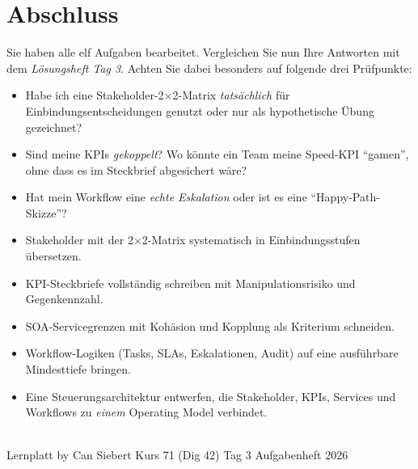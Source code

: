 \documentclass[11pt,a4paper,oneside]{article}
\begin{document}
\clearpage

\section*{Abschluss}
\thispagestyle{plain}

\noindent Sie haben alle elf Aufgaben bearbeitet. Vergleichen Sie nun Ihre Antworten mit dem \emph{L\"osungsheft Tag 3}. Achten Sie dabei besonders auf folgende drei Pr\"ufpunkte:

\begin{itemize}
  \item Habe ich eine Stakeholder-2$\times$2-Matrix \emph{tats\"achlich} f\"ur Einbindungsentscheidungen genutzt \textendash{} oder nur als hypothetische \"Ubung gezeichnet?
  \item Sind meine KPIs \emph{gekoppelt}? Wo k\"onnte ein Team meine Speed-KPI ``gamen'', ohne dass es im Steckbrief abgesichert w\"are?
  \item Hat mein Workflow eine \emph{echte Eskalation} \textendash{} oder ist es eine ``Happy-Path-Skizze''?
\end{itemize}

\medskip
\begin{infobox}
\begin{itemize}
  \item Stakeholder mit der 2$\times$2-Matrix systematisch in Einbindungsstufen \"ubersetzen.
  \item KPI-Steckbriefe vollst\"andig schreiben \textendash{} mit Manipulationsrisiko und Gegenkennzahl.
  \item SOA-Servicegrenzen mit Kohäsion und Kopplung als Kriterium schneiden.
  \item Workflow-Logiken (Tasks, SLAs, Eskalationen, Audit) auf eine ausf\"uhrbare Mindesttiefe bringen.
  \item Eine Steuerungsarchitektur entwerfen, die Stakeholder, KPIs, Services und Workflows zu \emph{einem} Operating Model verbindet.
\end{itemize}
\end{infobox}

\vspace{1cm}
\noindent{\color{lpAccent}\rule{\linewidth}{0.6pt}}\\[4pt]
{\footnotesize\sffamily\color{lpGray}Lernplatt \textperiodcentered{} by Can Siebert \textperiodcentered{} Kurs 71 (Dig 42) \textperiodcentered{} Tag 3 \textperiodcentered{} Aufgabenheft \textperiodcentered{} \textcopyright{} 2026}
\end{document}
